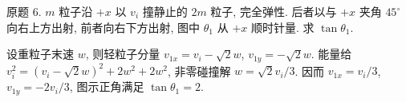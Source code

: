 \begin{exercise}
原题 6. $m$ 粒子沿 $+x$ 以 $v_i$ 撞静止的 $2m$ 粒子, 完全弹性. 后者以与 $+x$ 夹角 $45^\circ$ 向右上方出射, 前者向右下方出射, 图中 $\theta_1$ 从 $+x$ 顺时针量. 求 $\tan\theta_1$.
\end{exercise}
\begin{solution}
设重粒子末速 $w$, 则轻粒子分量 $v_{1x}=v_i-\sqrt2w$, $v_{1y}=-\sqrt2w$. 能量给 $v_i^2=(v_i-\sqrt2w)^2+2w^2+2w^2$, 非零碰撞解 $w=\sqrt2v_i/3$. 因而 $v_{1x}=v_i/3$, $v_{1y}=-2v_i/3$, 图示正角满足 $\tan\theta_1=2$.
\end{solution}
